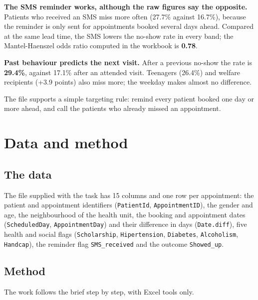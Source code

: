 \documentclass[12pt,a4paper]{article}
\newcommand{\F}[1]{{\small\texttt{#1}}}
\begin{document}
\textbf{The SMS reminder works, although the raw figures say the opposite.} Patients who
received an SMS miss more often (27.7\% against 16.7\%), because the reminder is only
sent for appointments booked several days ahead. Compared at the same lead time, the
SMS lowers the no-show rate in every band; the Mantel-Haenszel odds ratio computed in
the workbook is \textbf{0.78}.

\textbf{Past behaviour predicts the next visit.} After a previous no-show the rate is
\textbf{29.4\%}, against 17.1\% after an attended visit. Teenagers (26.4\%) and welfare
recipients (+3.9 points) also miss more; the weekday makes almost no difference.

The file supports a simple targeting rule: remind every patient booked one day or more
ahead, and call the patients who already missed an appointment.

\section{Data and method}\label{sec:data}

\subsection{The data}

The file supplied with the task has 15 columns and one row per appointment: the patient
and appointment identifiers (\F{PatientId}, \F{AppointmentID}), the gender and age, the
neighbourhood of the health unit, the booking and appointment dates (\F{ScheduledDay},
\F{AppointmentDay}) and their difference in days (\F{Date.diff}), five health and social
flags (\F{Scholarship}, \F{Hipertension}, \F{Diabetes}, \F{Alcoholism}, \F{Handcap}),
the reminder flag \F{SMS\_received} and the outcome \F{Showed\_up}.

\subsection{Method}

The work follows the brief step by step, with Excel tools only.
\end{document}
